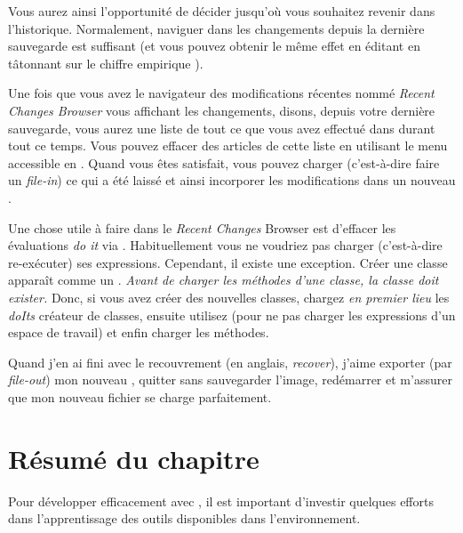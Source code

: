\documentclass[a4paper,10pt,twoside]{book}
\begin{document}

Vous aurez ainsi l'opportunité
de décider jusqu'où vous souhaitez revenir dans l'historique.
Normalement, naviguer dans les changements depuis la dernière sauvegarde
est suffisant (et vous pouvez obtenir le même effet en éditant 
 en tâtonnant sur le chiffre empirique
).

Une fois que vous avez le navigateur des modifications récentes nommé
\emph{Recent Changes Browser} vous affichant les changements, disons, depuis votre
dernière sauvegarde, vous aurez une liste de tout ce que vous avez effectué 
dans \pharo durant tout ce temps.
Vous pouvez effacer des articles de cette liste en utilisant le menu
accessible en \actclickant.
Quand vous êtes satisfait, vous
pouvez charger (c'est-à-dire faire un \emph{file-in}) ce qui a été laissé
et ainsi incorporer les modifications dans un nouveau \changeset.

Une chose utile à faire dans le \emph{Recent Changes} Browser est
d'effacer les évaluations \emph{do it} via . 
Habituellement vous ne voudriez pas charger (c'est-à-dire re-exécuter) ses expressions.
Cependant, il existe une exception.
Créer une classe apparaît comme un .
\emph{Avant de charger les méthodes d'une classe, la classe doit exister.}
Donc, si vous avez créer des nouvelles classes, chargez \emph{en premier lieu} 
les \emph{doIts} créateur de classes, ensuite utilisez  
(pour ne pas charger les expressions d'un espace de travail)
et enfin charger les méthodes.

Quand j'en ai fini avec le recouvrement (en anglais, \emph{recover}), 
j'aime exporter (par \emph{file-out}) mon nouveau \changeset, quitter \pharo
sans sauvegarder l'image, redémarrer et m'assurer que mon nouveau fichier
se charge parfaitement.

\section{Résumé du chapitre}

Pour développer efficacement avec \pharo, il est
important d'investir quelques efforts dans l'apprentissage des outils
disponibles dans l'environnement.
\end{document}
